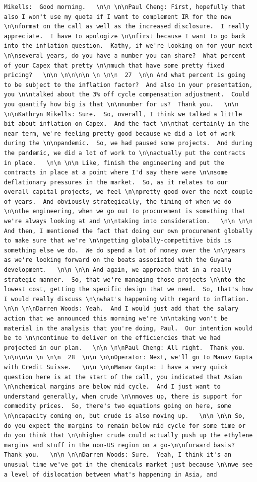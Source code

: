 \documentclass[
  letterpaper,
  DIV=11,
  numbers=noendperiod]{scrreprt}
\begin{document}
\begin{verbatim}
Mikells:  Good morning.   \n\n \n\nPaul Cheng: First, hopefully that also I won't use my quota if I want to complement IR for the new \n\nformat on the call as well as the increased disclosure.  I really appreciate.  I have to apologize \n\nfirst because I want to go back into the inflation question.  Kathy, if we're looking on for your next \n\nseveral years, do you have a number you can share?  What percent of your Capex that pretty \n\nmuch that have some pretty fixed pricing?   \n\n \n\n\n\n \n \n\n  27  \n\n And what percent is going to be subject to the inflation factor?  And also in your presentation, you \n\ntalked about the 3% off cycle compensation adjustment.  Could you quantify how big is that \n\nnumber for us?  Thank you.   \n\n \n\nKathryn Mikells: Sure.  So, overall, I think we talked a little bit about inflation on Capex.  And the fact \n\nthat certainly in the near term, we're feeling pretty good because we did a lot of work during the \n\npandemic.  So, we had paused some projects.  And during the pandemic, we did a lot of work to \n\nactually put the contracts in place.   \n\n \n\n Like, finish the engineering and put the contracts in place at a point where I'd say there were \n\nsome deflationary pressures in the market.  So, as it relates to our overall capital projects, we feel \n\npretty good over the next couple of years.  And obviously strategically, the timing of when we do \n\nthe engineering, when we go out to procurement is something that we're always looking at and \n\ntaking into consideration.   \n\n \n\n And then, I mentioned the fact that doing our own procurement globally to make sure that we're \n\ngetting globally-competitive bids is something else we do.  We do spend a lot of money over the \n\nyears as we're looking forward on the boats associated with the Guyana development.   \n\n \n\n And again, we approach that in a really strategic manner.  So, that we're managing those projects \n\nto the lowest cost, getting the specific design that we need.  So, that's how I would really discuss \n\nwhat's happening with regard to inflation.   \n\n \n\nDarren Woods: Yeah.  And I would just add that the salary action that we announced this morning we're \n\ntaking won't be material in the analysis that you're doing, Paul.  Our intention would be to \n\ncontinue to deliver on the efficiencies that we had projected in our plan.   \n\n \n\nPaul Cheng: All right.  Thank you.   \n\n\n\n \n \n\n  28  \n\n \n\nOperator: Next, we'll go to Manav Gupta with Credit Suisse.   \n\n \n\nManav Gupta: I have a very quick question here is at the start of the call, you indicated that Asian \n\nchemical margins are below mid cycle.  And I just want to understand generally, when crude \n\nmoves up, there is support for commodity prices.  So, there's two equations going on here, some \n\ncapacity coming on, but crude is also moving up.   \n\n \n\n So, do you expect the margins to remain below mid cycle for some time or do you think that \n\nhigher crude could actually push up the ethylene margins and stuff in the non-US region on a go-\n\nforward basis?  Thank you.   \n\n \n\nDarren Woods: Sure.  Yeah, I think it's an unusual time we've got in the chemicals market just because \n\nwe see a level of dislocation between what's happening in Asia, and 
\end{verbatim}
\end{document}
